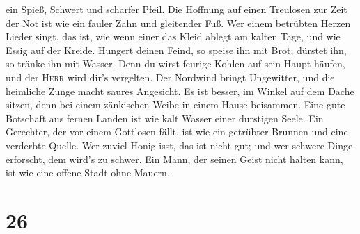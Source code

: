ein Spieß, Schwert und scharfer Pfeil.  Die Hoffnung auf
einen Treulosen zur Zeit der Not ist wie ein fauler Zahn und gleitender
Fuß.  Wer einem betrübten Herzen Lieder singt, das ist,
wie wenn einer das Kleid ablegt am kalten Tage, und wie Essig auf der
Kreide.  Hungert deinen Feind, so speise ihn mit Brot;
dürstet ihn, so tränke ihn mit Wasser.  Denn du wirst
feurige Kohlen auf sein Haupt häufen, und der \textsc{Herr} wird dir's
vergelten.  Der Nordwind bringt Ungewitter, und die
heimliche Zunge macht saures Angesicht.  Es ist besser,
im Winkel auf dem Dache sitzen, denn bei einem zänkischen Weibe in einem
Hause beisammen.  Eine gute Botschaft aus fernen Landen
ist wie kalt Wasser einer durstigen Seele.  Ein
Gerechter, der vor einem Gottlosen fällt, ist wie ein getrübter Brunnen
und eine verderbte Quelle.  Wer zuviel Honig isst, das
ist nicht gut; und wer schwere Dinge erforscht, dem wird's zu schwer.
 Ein Mann, der seinen Geist nicht halten kann, ist wie
eine offene Stadt ohne Mauern.

\hypertarget{section-25}{%
\section{26}\label{section-25}}

